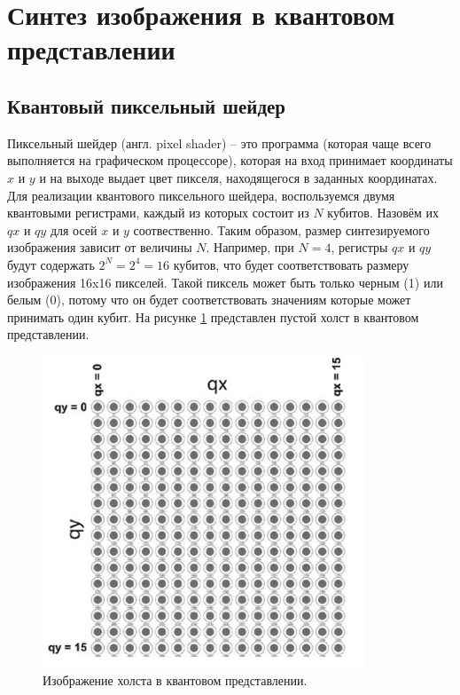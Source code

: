 \section{Синтез изображения в квантовом представлении}

\subsection{Квантовый пиксельный шейдер}

Пиксельный шейдер (англ. pixel shader) -- это программа (которая чаще всего выполняется на графическом процессоре), которая на вход принимает координаты $x$ и $y$ и на выходе выдает цвет пикселя, находящегося в заданных координатах. Для реализации квантового пиксельного шейдера, воспользуемся двумя квантовыми регистрами, каждый из которых состоит из $N$ кубитов. Назовём их $qx$ и $qy$ для осей $x$ и $y$ соотвественно. Таким образом, размер синтезируемого изображения зависит от величины $N$. Например, при $N = 4$, регистры $qx$ и $qy$ будут содержать $2^N = 2^4 = 16$ кубитов, что будет соответствовать размеру изображения 16x16 пикселей. Такой пиксель может быть только черным (1) или белым (0), потому что он будет соответствовать значениям которые может принимать один кубит. На рисунке \ref{img:holst} представлен пустой холст в квантовом представлении.

\begin{figure}[H]
	\begin{center}
		\includegraphics[scale=0.7]{img/holst.png}
	\end{center}
	\captionsetup{justification=centering}
	\caption{Изображение холста в квантовом представлении.}
	\label{img:holst}
\end{figure}

